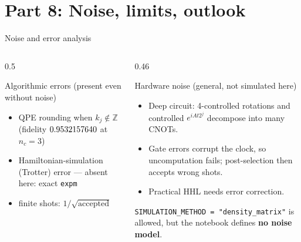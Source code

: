 \documentclass[aspectratio=169,11pt]{beamer}
\newcommand{\hl}[1]{{\color{qorange}\textbf{#1}}}
\begin{document}
\section{Part 8: Noise, limits, outlook}
\begin{frame}{Noise and error analysis}
  \begin{columns}[T]
    \begin{column}{0.5\textwidth}
      \begin{block}{Algorithmic errors (present even without noise)}
        \small
        \begin{itemize}
          \item QPE rounding when $k_j \notin \mathbb Z$ (fidelity $0.9532157640$ at $n_c = 3$)
          \item Hamiltonian-simulation (Trotter) error --- absent here: exact \texttt{expm}
          \item finite shots: $1/\sqrt{\text{accepted}}$
        \end{itemize}
      \end{block}
    \end{column}
    \begin{column}{0.46\textwidth}
      \begin{block}{Hardware noise (general, not simulated here)}
        \small
        \begin{itemize}
          \item Deep circuit: 4-controlled rotations and controlled $e^{iAt2^j}$ decompose into many CNOTs.
          \item Gate errors corrupt the clock, so uncomputation fails; post-selection then accepts wrong shots.
          \item Practical HHL needs error correction.
        \end{itemize}
      \end{block}
      \small \texttt{SIMULATION\_METHOD = "density\_matrix"} is allowed, but the notebook defines \hl{no noise model}.
    \end{column}
  \end{columns}
\end{frame}
\end{document}
